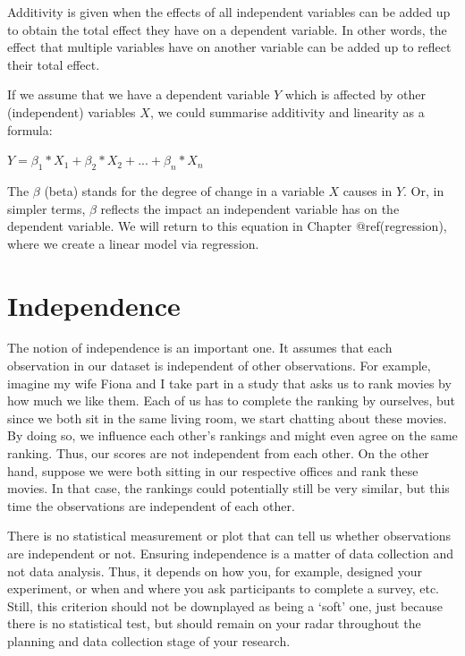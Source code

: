 \documentclass[
  letterpaper,
]{krantz}
\begin{document}
Additivity is given when the effects of all independent variables can be
added up to obtain the total effect they have on a dependent variable.
In other words, the effect that multiple variables have on another
variable can be added up to reflect their total effect.

If we assume that we have a dependent variable \(Y\) which is affected
by other (independent) variables \(X\), we could summarise additivity
and linearity as a formula:

\label{linearity_additivity-formula}
\(Y = \beta_{1} * X_1 + \beta_{2} * X_{2} + ... + \beta_{n} * X_{n}\)

The \(\beta\) (beta) stands for the degree of change in a variable \(X\)
causes in \(Y\). Or, in simpler terms, \(\beta\) reflects the impact an
independent variable has on the dependent variable. We will return to
this equation in Chapter @ref(regression), where we create a linear
model via regression.

\section{Independence}\label{independence}

The notion of independence is an important one. It assumes that each
observation in our dataset is independent of other observations. For
example, imagine my wife Fiona and I take part in a study that asks us
to rank movies by how much we like them. Each of us has to complete the
ranking by ourselves, but since we both sit in the same living room, we
start chatting about these movies. By doing so, we influence each
other's rankings and might even agree on the same ranking. Thus, our
scores are not independent from each other. On the other hand, suppose
we were both sitting in our respective offices and rank these movies. In
that case, the rankings could potentially still be very similar, but
this time the observations are independent of each other.

There is no statistical measurement or plot that can tell us whether
observations are independent or not. Ensuring independence is a matter
of data collection and not data analysis. Thus, it depends on how you,
for example, designed your experiment, or when and where you ask
participants to complete a survey, etc. Still, this criterion should not
be downplayed as being a `soft' one, just because there is no
statistical test, but should remain on your radar throughout the
planning and data collection stage of your research.
\end{document}
